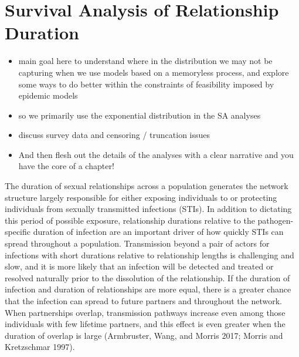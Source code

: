 \documentclass [11pt, proquest] {uwthesis}[2015/03/03]
\providecommand{\tightlist}{%
  \setlength{\itemsep}{0pt}\setlength{\parskip}{0pt}}
\begin{document}
\chapter{Survival Analysis of Relationship Duration}\label{surv}
\begin{itemize}
\tightlist
\item
  main goal here to understand where in the distribution we may not be
  capturing when we use models based on a memoryless process, and
  explore some ways to do better within the constraints of feasibility
  imposed by epidemic models
\item
  so we primarily use the exponential distribution in the SA analyses
\item
  discuss survey data and censoring / truncation issues
\item
  And then flesh out the details of the analyses with a clear narrative
  and you have the core of a chapter!
\end{itemize}
The duration of sexual relationships across a population generates the
network structure largely responsible for either exposing individuals to
or protecting individuals from sexually transmitted infections (STIs).
In addition to dictating this period of possible exposure, relationship
durations relative to the pathogen-specific duration of infection are an
important driver of how quickly STIs can spread throughout a population.
Transmission beyond a pair of actors for infections with short durations
relative to relationship lengths is challenging and slow, and it is more
likely that an infection will be detected and treated or resolved
naturally prior to the dissolution of the relationship. If the duration
of infection and duration of relationships are more equal, there is a
greater chance that the infection can spread to future partners and
throughout the network. When partnerships overlap, transmission pathways
increase even among those individuals with few lifetime partners, and
this effect is even greater when the duration of overlap is large
(Armbruster, Wang, and Morris 2017; Morris and Kretzschmar 1997).
\end{document}
